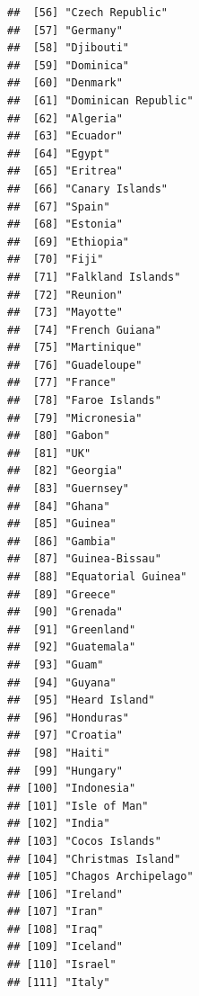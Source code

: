 \documentclass[
]{article}
\begin{document}
\begin{verbatim}
##  [56] "Czech Republic"                     
##  [57] "Germany"                            
##  [58] "Djibouti"                           
##  [59] "Dominica"                           
##  [60] "Denmark"                            
##  [61] "Dominican Republic"                 
##  [62] "Algeria"                            
##  [63] "Ecuador"                            
##  [64] "Egypt"                              
##  [65] "Eritrea"                            
##  [66] "Canary Islands"                     
##  [67] "Spain"                              
##  [68] "Estonia"                            
##  [69] "Ethiopia"                           
##  [70] "Fiji"                               
##  [71] "Falkland Islands"                   
##  [72] "Reunion"                            
##  [73] "Mayotte"                            
##  [74] "French Guiana"                      
##  [75] "Martinique"                         
##  [76] "Guadeloupe"                         
##  [77] "France"                             
##  [78] "Faroe Islands"                      
##  [79] "Micronesia"                         
##  [80] "Gabon"                              
##  [81] "UK"                                 
##  [82] "Georgia"                            
##  [83] "Guernsey"                           
##  [84] "Ghana"                              
##  [85] "Guinea"                             
##  [86] "Gambia"                             
##  [87] "Guinea-Bissau"                      
##  [88] "Equatorial Guinea"                  
##  [89] "Greece"                             
##  [90] "Grenada"                            
##  [91] "Greenland"                          
##  [92] "Guatemala"                          
##  [93] "Guam"                               
##  [94] "Guyana"                             
##  [95] "Heard Island"                       
##  [96] "Honduras"                           
##  [97] "Croatia"                            
##  [98] "Haiti"                              
##  [99] "Hungary"                            
## [100] "Indonesia"                          
## [101] "Isle of Man"                        
## [102] "India"                              
## [103] "Cocos Islands"                      
## [104] "Christmas Island"                   
## [105] "Chagos Archipelago"                 
## [106] "Ireland"                            
## [107] "Iran"                               
## [108] "Iraq"                               
## [109] "Iceland"                            
## [110] "Israel"                             
## [111] "Italy"                              

\end{verbatim}
\end{document}
